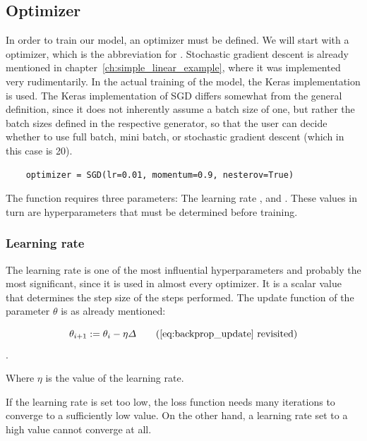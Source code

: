 \subsection{Optimizer}

In order to train our model, an optimizer must be defined.
We will start with a  optimizer, which is the abbreviation for .
Stochastic gradient descent is already mentioned in chapter~\ref{ch:simple_linear_example}, where it was implemented very rudimentarily. In the actual training of the model, the Keras implementation is used.
The Keras implementation of SGD differs somewhat from the general definition, since it does not inherently assume a batch size of one, but rather the batch sizes defined in the respective generator, so that the user can decide whether to use full batch, mini batch, or stochastic gradient descent (which in this case is 20).

\begin{lstlisting}
    optimizer = SGD(lr=0.01, momentum=0.9, nesterov=True)
\end{lstlisting}

The function  requires three parameters: The learning rate ,  and .
These values in turn are hyperparameters that must be determined before training.

\subsubsection{Learning rate}

The learning rate is one of the most influential hyperparameters and probably the most significant, since it is used in almost every optimizer.
It is a scalar value that determines the step size of the steps performed. The update function of the parameter $\theta$ is as already mentioned:

\begin{equation}
    \theta_{i+1} := \theta_i - \eta \varDelta \tag{\ref{eq:backprop_update} revisited}
\end{equation}.

Where $\eta$ is the value of the learning rate.

If the learning rate is set too low, the loss function needs many iterations to converge to a sufficiently low value.
On the other hand, a learning rate set to a high value cannot converge at all.

